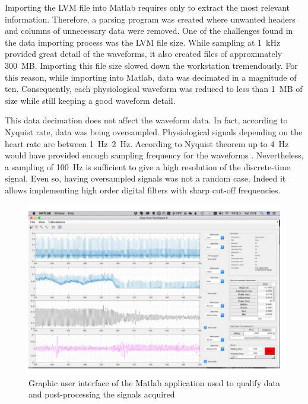 Importing the LVM file into Matlab requires only to extract the most relevant information. Therefore, a parsing program was created where unwanted headers and columns of unnecessary data were removed. One of the challenges found in the data importing process was the LVM file size. While sampling at \SI{1}{\kilo\hertz} provided great detail of the waveforms, it also created files of approximately \SI{300}{MB}. Importing this file size slowed down the workstation tremendously. For this reason, while importing into Matlab, data was decimated in a magnitude of ten. Consequently, each physiological waveform was reduced to less than \SI{1}{MB} of size while still keeping a good waveform detail. 

This data decimation does not affect the waveform data. In fact, according to Nyquist rate, data was being oversampled. Physiological signals depending on the heart rate are between \SIrange{1}{2}{\hertz}. According to Nyquist theorem up to \SI{4}{\hertz} would have provided enough sampling frequency for the waveforms \cite{nyquist1928certain}. Nevertheless, a sampling of \SI{100}{\hertz} is sufficient to give a high resolution of the discrete-time signal. Even so, having oversampled signals was not a random case. Indeed it allows implementing high order digital filters with sharp cut-off frequencies. 

\begin{figure}[!htpb]
	\centering
	\includegraphics[width=15cm,keepaspectratio]{figure4}
	\caption[Graphic user interface of the Matlab application]{Graphic user interface of the Matlab application used to qualify data and post-processing the signals acquired}
	\label{fig:Matlalb Interface}
\end{figure}

